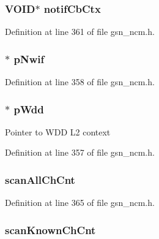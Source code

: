 \hypertarget{a00158_a3b4dee05b0f332ef6668c044d86f1b28}{
\subsubsection[{notifCbCtx}]{\setlength{\rightskip}{0pt plus 5cm}VOID$\ast$ {\bf notifCbCtx}}}
\label{a00158_a3b4dee05b0f332ef6668c044d86f1b28}


Definition at line 361 of file gsn\_\-ncm.h.

\hypertarget{a00158_a98d510676ecd134a5e9ac61bf222cded}{
\subsubsection[{pNwif}]{$\ast$ {\bf pNwif}}}
\label{a00158_a98d510676ecd134a5e9ac61bf222cded}


Definition at line 358 of file gsn\_\-ncm.h.

\hypertarget{a00158_a97684b58b7a05f9b282a86a26929e1ba}{
\subsubsection[{pWdd}]{$\ast$ {\bf pWdd}}}
\label{a00158_a97684b58b7a05f9b282a86a26929e1ba}
Pointer to WDD L2 context 

Definition at line 357 of file gsn\_\-ncm.h.

\hypertarget{a00158_a6b765a8738e9378533592c4280256ca6}{
\subsubsection[{scanAllChCnt}]{ {\bf scanAllChCnt}}}
\label{a00158_a6b765a8738e9378533592c4280256ca6}


Definition at line 365 of file gsn\_\-ncm.h.

\hypertarget{a00158_af4d92408837352462c289af3d51b75d0}{
\subsubsection[{scanKnownChCnt}]{ {\bf scanKnownChCnt}}}
\label{a00158_af4d92408837352462c289af3d51b75d0}


